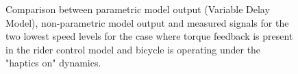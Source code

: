 \begin{figure}[!h]
    \centering
    \begin{subfigure}[b]{\textwidth}
        \centering
        \caption{}
        \label{fig:dm_fit1}
    \end{subfigure}
    \begin{subfigure}[b]{\textwidth}
        \centering
        \caption{}
        \label{fig:dm_fit2}
    \end{subfigure}
    
    \caption{Comparison between parametric model output (Variable Delay Model), non-parametric model output and measured signals for the two lowest speed levels for the case where torque feedback is present in the rider control model and bicycle is operating under the "haptics on" dynamics.}
    \label{fig:dm_fitA}
 \end{figure}

